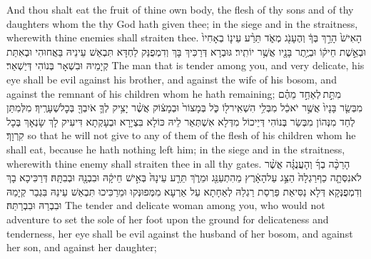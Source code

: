 {And thou shalt eat the fruit of thine own body, the flesh of thy sons and of thy daughters whom the \lord\space thy God hath given thee; in the siege and in the straitness, wherewith thine enemies shall straiten thee.}{}
{הָאִישׁ֙ הָרַ֣ךְ בְּךָ֔ וְהֶעָנֹ֖ג מְאֹ֑ד תֵּרַ֨ע עֵינ֤וֹ בְאָחִיו֙ וּבְאֵ֣שֶׁת חֵיק֔וֹ וּבְיֶ֥תֶר בָּנָ֖יו אֲשֶׁ֥ר יוֹתִֽיר׃}
{גּוּבְרָא דְּרַכִּיךְ בָּךְ וְדִמְפֻנַּק לַחְדָּא תִּבְאַשׁ עֵינֵיהּ בַּאֲחוּהִי וּבְאִתַּת קְיָמֵיהּ וּבִשְׁאָר בְּנוֹהִי דְּיַשְׁאַר׃}
{The man that is tender among you, and very delicate, his eye shall be evil against his brother, and against the wife of his bosom, and against the remnant of his children whom he hath remaining;}{}
{מִתֵּ֣ת \legarmeh  לְאַחַ֣ד מֵהֶ֗ם מִבְּשַׂ֤ר בָּנָיו֙ אֲשֶׁ֣ר יֹאכֵ֔ל מִבְּלִ֥י הִשְׁאִֽיר\maqqaf ל֖וֹ כֹּ֑ל בְּמָצוֹר֙ וּבְמָצ֔וֹק אֲשֶׁ֨ר יָצִ֥יק לְךָ֛ אֹיִבְךָ֖ בְּכׇל\maqqaf שְׁעָרֶֽיךָ׃}
{מִלְּמִתַּן לְחַד מִנְּהוֹן מִבְּשַׂר בְּנוֹהִי דְּיֵיכוֹל מִדְּלָא אִשְׁתְּאַר לֵיהּ כּוֹלָא בִּצְיָרָא וּבְעָקְתָא דִּיעִיק לָךְ שָׂנְאָךְ בְּכָל קִרְוָךְ׃}
{so that he will not give to any of them of the flesh of his children whom he shall eat, because he hath nothing left him; in the siege and in the straitness, wherewith thine enemy shall straiten thee in all thy gates.}{}
{הָרַכָּ֨ה בְךָ֜ וְהָעֲנֻגָּ֗ה אֲשֶׁ֨ר לֹא\maqqaf נִסְּתָ֤ה כַף\maqqaf רַגְלָהּ֙ הַצֵּ֣ג עַל\maqqaf הָאָ֔רֶץ מֵהִתְעַנֵּ֖ג וּמֵרֹ֑ךְ תֵּרַ֤ע עֵינָהּ֙ בְּאִ֣ישׁ חֵיקָ֔הּ וּבִבְנָ֖הּ וּבְבִתָּֽהּ׃}
{דְּרַכִּיכָא בָךְ וְדִמְפֻנְּקָא דְּלָא נַסִּיאַת פַּרְסַת רַגְלַהּ לְאַחָתָא עַל אַרְעָא מִמְּפוּנְּקוּ וּמֵרַכִּיכוּ תִּבְאַשׁ עֵינַהּ בִּגְבַר קְיָמַהּ וּבִבְרַהּ וּבִבְרַתַּהּ׃}
{The tender and delicate woman among you, who would not adventure to set the sole of her foot upon the ground for delicateness and tenderness, her eye shall be evil against the husband of her bosom, and against her son, and against her daughter;}{}
